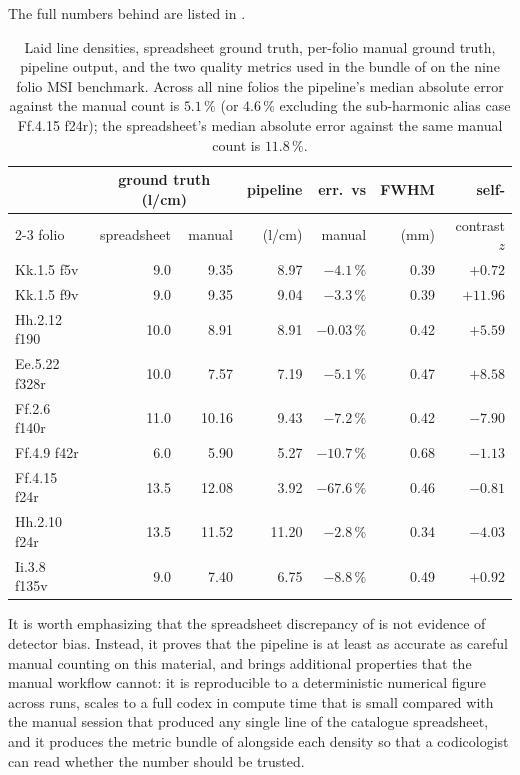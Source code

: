 The full numbers behind  are listed in
.
\begin{table}[!htbp]
  \centering
  \small
  \begin{tabular}{lrrrrrr}
    \toprule
                  & \multicolumn{2}{c}{ground truth (l/cm)} & pipeline & err.\ vs & FWHM & self- \\
    \cmidrule(lr){2-3}
    folio         & spreadsheet & manual & (l/cm) & manual & (mm) & contrast $z$ \\
    \midrule
    Kk.1.5 f5v    &  9.0 &  9.35 &  8.97 & $-4.1\,\%$  & 0.39 & $+0.72$ \\
    Kk.1.5 f9v    &  9.0 &  9.35 &  9.04 & $-3.3\,\%$  & 0.39 & $+11.96$ \\
    Hh.2.12 f190  & 10.0 &  8.91 &  8.91 & $-0.03\,\%$ & 0.42 & $+5.59$ \\
    Ee.5.22 f328r & 10.0 &  7.57 &  7.19 & $-5.1\,\%$  & 0.47 & $+8.58$ \\
    Ff.2.6 f140r  & 11.0 & 10.16 &  9.43 & $-7.2\,\%$  & 0.42 & $-7.90$ \\
    Ff.4.9 f42r   &  6.0 &  5.90 &  5.27 & $-10.7\,\%$ & 0.68 & $-1.13$ \\
    Ff.4.15 f24r  & 13.5 & 12.08 &  3.92 & $-67.6\,\%$ & 0.46 & $-0.81$ \\
    Hh.2.10 f24r  & 13.5 & 11.52 & 11.20 & $-2.8\,\%$  & 0.34 & $-4.03$ \\
    Ii.3.8 f135v  &  9.0 &  7.40 &  6.75 & $-8.8\,\%$  & 0.49 & $+0.92$ \\
    \bottomrule
  \end{tabular}
  \caption{Laid line densities, spreadsheet ground truth, per-folio
  manual ground truth, pipeline output, and the two quality metrics
  used in the bundle of  on the
  nine folio MSI benchmark. Across all nine folios the pipeline's
  median absolute error against the manual count is $5.1\,\%$ (or
  $4.6\,\%$ excluding the sub-harmonic alias case Ff.4.15 f24r);
  the spreadsheet's median absolute error against the same manual
  count is $11.8\,\%$.}
  \label{tab:msi_benchmark}
\end{table}

It is worth emphasizing that the spreadsheet
discrepancy of  is not
evidence of detector bias. Instead, it proves that the
pipeline is at least as accurate as careful manual
counting on this material, and brings additional properties
that the manual workflow cannot: it is reproducible to a
deterministic numerical figure across runs, scales to a full
codex in compute time that is small compared with the manual
session that produced any single line of the catalogue
spreadsheet, and it produces the metric bundle of
 alongside each density so that a
codicologist can read whether the number should be trusted.


